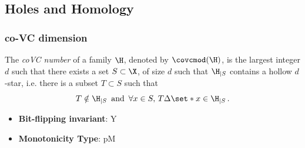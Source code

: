 \subsection{Holes and Homology}\label{sec:Holes and Homology}
\subsubsection{co-VC dimension}
      
      \begin{definition}\label{def:co-vc_dimension}
      The {\em coVC number} of a family $\H$, denoted by $\covcmod(\H)$, is the largest integer $d$ such that there exists a set $S\subset \X$, of size $d$ such that $\H_{|S}$ contains a hollow $d$-star, i.e. there is a subset $T\subset S$ such that \[ T\notin \H_{|S} \,\mbox{ and }\, \forall x\in S,\, T\Delta \set*{x} \in \H_{|S}\,. \]
      \end{definition}
      \begin{itemize}
      \item {\bf Bit-flipping invariant}: Y
      \item {\bf Monotonicity Type}: pM
      \end{itemize}

